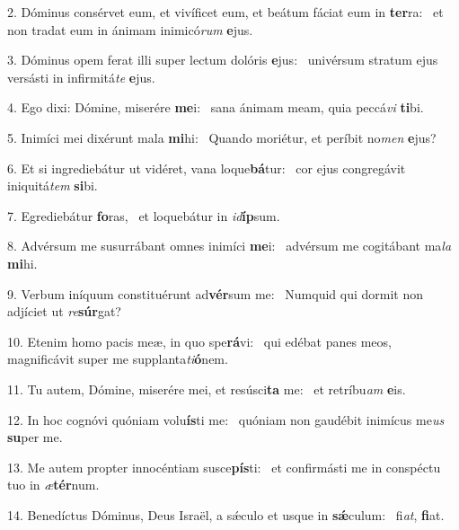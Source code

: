 2. Dóminus consérvet eum, et vivíficet eum, et beátum fáciat eum in \textbf{ter}ra: \ast\  et non tradat eum in ánimam inimicó\textit{rum} \textbf{e}jus.\

3. Dóminus opem ferat illi super lectum dolóris \textbf{e}jus: \ast\  univérsum stratum ejus versásti in infirmitá\textit{te} \textbf{e}jus.\

4. Ego dixi: Dómine, miserére \textbf{me}i: \ast\  sana ánimam meam, quia peccá\textit{vi} \textbf{ti}bi.\

5. Inimíci mei dixérunt mala \textbf{mi}hi: \ast\  Quando moriétur, et períbit no\textit{men} \textbf{e}jus?\

6. Et si ingrediebátur ut vidéret, vana loque\textbf{bá}tur: \ast\  cor ejus congregávit iniquitá\textit{tem} \textbf{si}bi.\

7. Egrediebátur \textbf{fo}ras, \ast\  et loquebátur in \textit{id}\textbf{íp}sum.\

8. Advérsum me susurrábant omnes inimíci \textbf{me}i: \ast\  advérsum me cogitábant ma\textit{la} \textbf{mi}hi.\

9. Verbum iníquum constituérunt ad\textbf{vér}sum me: \ast\  Numquid qui dormit non adjíciet ut \textit{re}\textbf{súr}gat?\

10. Etenim homo pacis meæ, in quo spe\textbf{rá}vi: \ast\  qui edébat panes meos, magnificávit super me supplanta\textit{ti}\textbf{ó}nem.\

11. Tu autem, Dómine, miserére mei, et resúsci\textbf{ta} me: \ast\  et retríbu\textit{am} \textbf{e}is.\

12. In hoc cognóvi quóniam volu\textbf{ís}ti me: \ast\  quóniam non gaudébit inimícus me\textit{us} \textbf{su}per me.\

13. Me autem propter innocéntiam susce\textbf{pís}ti: \ast\  et confirmásti me in conspéctu tuo in \textit{æ}\textbf{tér}num.\

14. Benedíctus Dóminus, Deus Israël, a sǽculo et usque in \textbf{sǽ}culum: \ast\  fi\textit{at}, \textbf{fi}at.\

